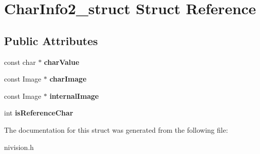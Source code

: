 \hypertarget{structCharInfo2__struct}{
\section{CharInfo2\_\-struct Struct Reference}
\label{structCharInfo2__struct}
}
\subsection*{Public Attributes}
\begin{DoxyCompactItemize}
\item 
\hypertarget{structCharInfo2__struct_ace98064baf5022d1c9410fc4f4e07b6c}{
const char $\ast$ {\bfseries charValue}}
\label{structCharInfo2__struct_ace98064baf5022d1c9410fc4f4e07b6c}

\item 
\hypertarget{structCharInfo2__struct_a3c714a19bd4dbb0ecdc049932ac17ddd}{
const Image $\ast$ {\bfseries charImage}}
\label{structCharInfo2__struct_a3c714a19bd4dbb0ecdc049932ac17ddd}

\item 
\hypertarget{structCharInfo2__struct_a59a516a2b608303c87782feac8715751}{
const Image $\ast$ {\bfseries internalImage}}
\label{structCharInfo2__struct_a59a516a2b608303c87782feac8715751}

\item 
\hypertarget{structCharInfo2__struct_a56a8c5744ef30e966342f493378e7c86}{
int {\bfseries isReferenceChar}}
\label{structCharInfo2__struct_a56a8c5744ef30e966342f493378e7c86}

\end{DoxyCompactItemize}


The documentation for this struct was generated from the following file:\begin{DoxyCompactItemize}
\item 
nivision.h\end{DoxyCompactItemize}
